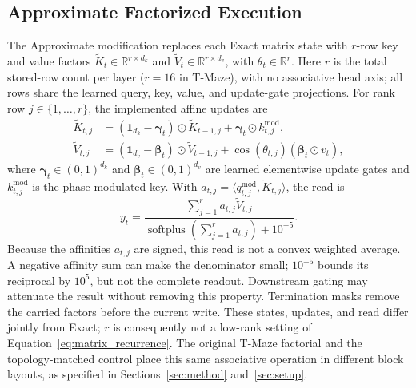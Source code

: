 \subsection{Approximate Factorized Execution}
\label{app:approximate_execution}
The Approximate modification replaces each Exact matrix state with $r$-row
key and value factors $\widetilde K_t\in\mathbb{R}^{r\times d_k}$ and
$\widetilde V_t\in\mathbb{R}^{r\times d_v}$, with $\theta_t\in\mathbb{R}^r$.
Here $r$ is the total stored-row count per layer ($r=16$ in T-Maze), with no
associative head axis; all rows share the learned query, key, value, and update-gate projections. For rank row
$j\in\{1,\ldots,r\}$, the implemented affine updates are
\begin{align}
\widetilde K_{t,j}
  &=(\mathbf 1_{d_k}-\boldsymbol\gamma_t)\odot\widetilde K_{t-1,j}
    +\boldsymbol\gamma_t\odot k^{\mathrm{mod}}_{t,j},\\
\widetilde V_{t,j}
  &=(\mathbf 1_{d_v}-\boldsymbol\beta_t)\odot\widetilde V_{t-1,j}
    +\cos(\theta_{t,j})(\boldsymbol\beta_t\odot v_t),
\end{align}
where $\boldsymbol\gamma_t\in(0,1)^{d_k}$ and
$\boldsymbol\beta_t\in(0,1)^{d_v}$ are learned elementwise update gates and
$k^{\mathrm{mod}}_{t,j}$ is the phase-modulated key. With
$a_{t,j}=\langle q^{\mathrm{mod}}_{t,j},\widetilde K_{t,j}\rangle$, the read is
\begin{equation}
y_t=\frac{\sum_{j=1}^{r}a_{t,j}\widetilde V_{t,j}}
{\operatorname{softplus}\!\left(\sum_{j=1}^{r}a_{t,j}\right)+10^{-5}}.
\end{equation}
Because the affinities $a_{t,j}$ are signed, this read is not a convex weighted
average. A negative affinity sum can make the denominator small; $10^{-5}$
bounds its reciprocal by $10^5$, but not the complete readout. Downstream
gating may attenuate the result without removing this property.
Termination masks remove the carried factors before the current write. These
states, updates, and read differ jointly from Exact; $r$ is consequently not a
low-rank setting of Equation~\ref{eq:matrix_recurrence}. The original T-Maze
factorial and the topology-matched control place this same associative operation
in different block layouts, as specified in Sections~\ref{sec:method}
and~\ref{sec:setup}.

